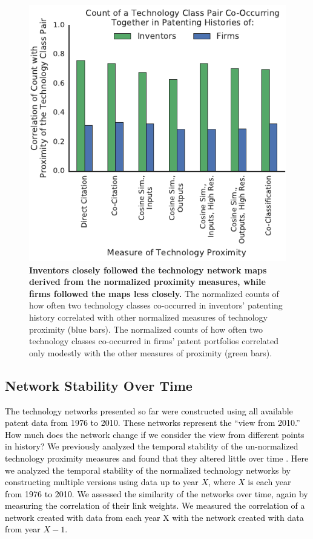 \documentclass[]{svjour3}
\begin{document}
\begin{figure}[ht!]
\begin{center}
\includegraphics[width=.7\textwidth]{figs/Relatedness_Behavior_Correlation_IPC.pdf} 
\end{center}
\caption{\textbf{Inventors closely followed the technology network maps derived from the normalized proximity measures, while firms followed the maps less closely.} The normalized counts of how often two technology classes co-occurred in inventors' patenting history correlated with other normalized measures of technology proximity (blue bars). The normalized counts of how often two technology classes co-occurred in firms' patent portfolios correlated only modestly with the other measures of proximity (green bars).
}\label{Relatedness_Behavior_Correlation}
\end{figure}

\subsection{Network Stability Over Time}
\textcolor{black}{The technology networks presented so far were constructed using all available patent data from 1976 to 2010. These networks represent the ``view from 2010.'' How much does the network change if we consider the view from different points in history? We previously analyzed the temporal stability of the un-normalized technology proximity measures and found that they altered little over time \citep{Yan2015}. Here we analyzed the temporal stability of the normalized technology networks by constructing multiple versions using data up to year $X$, where $X$ is each year from 1976 to 2010. We assessed the similarity of the networks over time, again by measuring the correlation of their link weights. We measured the correlation of a network created with data from each year X with the network created with data from year $X-1$.}
\end{document}
